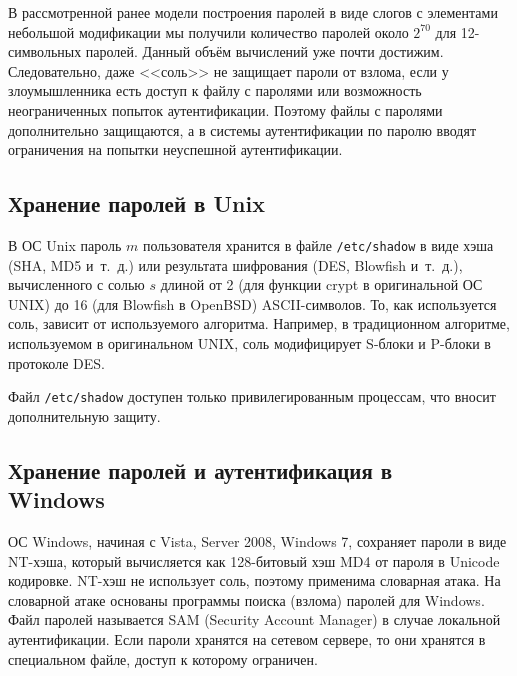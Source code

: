 В рассмотренной ранее модели построения паролей в виде слогов с элементами небольшой модификации мы получили количество паролей около $2^{70}$ для 12-символьных паролей. Данный объём вычислений уже почти достижим. Следовательно, даже <<соль>> не защищает пароли от взлома, если у злоумышленника есть доступ к файлу с паролями или возможность неограниченных попыток аутентификации. Поэтому файлы с паролями дополнительно защищаются, а в системы аутентификации по паролю вводят ограничения на попытки неуспешной аутентификации.

\subsection[Unix]{Хранение паролей в Unix}

В ОС Unix пароль $m$ пользователя хранится в файле \texttt{/etc/shadow} в виде хэша (SHA, MD5 и~т.~д.) или результата шифрования (DES, Blowfish и~т.~д.), вычисленного с солью $s$ длиной от 2 (для функции crypt в оригинальной ОС UNIX) до 16 (для Blowfish в OpenBSD) ASCII-символов. То, как используется соль, зависит от используемого алгоритма. Например, в традиционном алгоритме, используемом в оригинальном UNIX, соль модифицирует S-блоки и P-блоки в протоколе DES.

Файл \texttt{/etc/shadow} доступен только привилегированным процессам, что вносит дополнительную защиту.


\subsection[Windows]{Хранение паролей и аутентификация в \protect\\ Windows}


ОС Windows, начиная с Vista, Server 2008, Windows 7, сохраняет пароли в виде NT-хэша, который вычисляется как 128-битовый хэш MD4 от пароля в Unicode кодировке. NT-хэш не использует соль, поэтому применима словарная атака. На словарной атаке основаны программы поиска (взлома) паролей для Windows. Файл паролей называется SAM (Security Account Manager) в случае локальной аутентификации. Если пароли хранятся на сетевом сервере, то они хранятся в специальном файле, доступ к которому ограничен.

